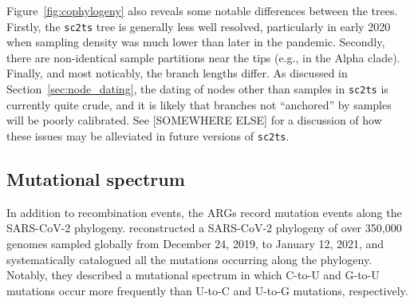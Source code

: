 \documentclass{article}
\begin{document}
Figure~\ref{fig:cophylogeny} also reveals some notable differences between the
trees. Firstly, the \texttt{sc2ts} tree is generally less well resolved,
particularly in early 2020 when sampling density was much lower than
later in the pandemic.
Secondly, there are non-identical sample partitions
near the tips (e.g., in the Alpha clade).
Finally, and most noticably, the branch lengths differ.
As discussed in Section~\ref{sec:node_dating}, the dating of nodes
other than samples in \texttt{sc2ts} is currently quite crude, and
it is likely that branches not ``anchored'' by samples will be
poorly calibrated. See [SOMEWHERE ELSE] for a discussion of how
these issues may be alleviated in future versions of \texttt{sc2ts}.



\subsection{Mutational spectrum}
\label{sec:mutation_spectrum}
 In addition to recombination events, the ARGs record mutation events along the
SARS-CoV-2 phylogeny. \cite{Yi2021-sc} reconstructed a SARS-CoV-2 phylogeny of
over 350,000 genomes sampled globally from December 24, 2019, to January 12,
2021, and systematically catalogued all the mutations occurring along the
phylogeny. Notably, they described a mutational spectrum in which C-to-U and
G-to-U mutations occur more frequently than U-to-C and U-to-G mutations,
respectively.
\end{document}
